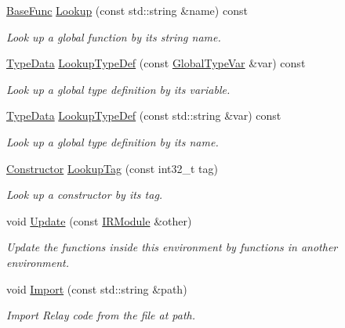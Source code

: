 \begin{DoxyCompactItemize}
\hyperlink{classtvm_1_1BaseFunc}{Base\+Func} \hyperlink{classtvm_1_1IRModuleNode_abbebfa676ee155c644a97ce33ad599ca}{Lookup} (const std\+::string \&name) const 
\begin{DoxyCompactList}\small\item\em Look up a global function by its string name. \end{DoxyCompactList}\item 
\hyperlink{classtvm_1_1TypeData}{Type\+Data} \hyperlink{classtvm_1_1IRModuleNode_a48ba730bc22c3b7ab06fcc79d9f2ec9a}{Lookup\+Type\+Def} (const \hyperlink{classtvm_1_1GlobalTypeVar}{Global\+Type\+Var} \&var) const 
\begin{DoxyCompactList}\small\item\em Look up a global type definition by its variable. \end{DoxyCompactList}\item 
\hyperlink{classtvm_1_1TypeData}{Type\+Data} \hyperlink{classtvm_1_1IRModuleNode_a81eb5a98228295ac0f58f5ad8df02d33}{Lookup\+Type\+Def} (const std\+::string \&var) const 
\begin{DoxyCompactList}\small\item\em Look up a global type definition by its name. \end{DoxyCompactList}\item 
\hyperlink{classtvm_1_1Constructor}{Constructor} \hyperlink{classtvm_1_1IRModuleNode_ae078ad8def39579701d144578c787bcf}{Lookup\+Tag} (const int32\+\_\+t tag)
\begin{DoxyCompactList}\small\item\em Look up a constructor by its tag. \end{DoxyCompactList}\item 
void \hyperlink{classtvm_1_1IRModuleNode_a94a93385e64ce844299729af6a573015}{Update} (const \hyperlink{classtvm_1_1IRModule}{I\+R\+Module} \&other)
\begin{DoxyCompactList}\small\item\em Update the functions inside this environment by functions in another environment. \end{DoxyCompactList}\item 
void \hyperlink{classtvm_1_1IRModuleNode_a88551ba5a3aef9640c771473b9dff0d5}{Import} (const std\+::string \&path)
\begin{DoxyCompactList}\small\item\em Import Relay code from the file at path. \end{DoxyCompactList}\item 

\end{DoxyCompactItemize}
